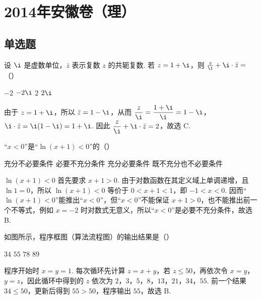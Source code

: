 \chapter{2014年安徽卷（理）}

\section{单选题}

\begin{problem}
设 \(\i\) 是虚数单位，\(\bar z\) 表示复数 \(z\) 的共轭复数. 若 \(z = 1 + \i\)，则 \(\frac{z}{\i} + \i \cdot \bar z = \)（\quad）

\choices
    {\(-2\)}
    {\(-2\i\)}
    {\(2\)}
    {\(2\i\)}

\begin{solution}
由于 \(z=1+\i\)，所以 \(\bar z=1-\i\)，从而 \(\dfrac{z}{\i}=\dfrac{1+\i}{\i}=1-\i\)，\(\i\cdot\bar z=\i(1-\i)=1+\i\). 因此 \(\dfrac{z}{\i}+\i\cdot\bar z=2\)，故选 C.
\end{solution}
\end{problem}

\begin{problem}
“\(x < 0\)”是“\(\ln(x + 1) < 0\)”的（\quad）

\choices
    {充分不必要条件}
    {必要不充分条件}
    {充分必要条件}
    {既不充分也不必要条件}

\begin{solution}
\(\ln(x+1)<0\) 首先要求 \(x+1>0\). 由于对数函数在其定义域上单调递增，且 \(\ln 1=0\)，所以 \(\ln(x+1)<0\) 等价于 \(0<x+1<1\)，即 \(-1<x<0\). 因而“\(\ln(x+1)<0\)”能推出“\(x<0\)”，但“\(x<0\)”不能保证 \(x+1>0\)，也不能推出前一个不等式，例如 \(x=-2\) 时对数式无意义，所以“\(x<0\)”是必要不充分条件，故选 B.
\end{solution}
\end{problem}

\begin{problem}
如图所示，程序框图（算法流程图）的输出结果是（\quad）


\choices
    {\(34\)}
    {\(55\)}
    {\(78\)}
    {\(89\)}

\begin{solution}
程序开始时 \(x=y=1\). 每次循环先计算 \(z=x+y\)，若 \(z\leqslant50\)，再依次令 \(x=y\)，\(y=z\)，因此循环中得到的 \(z\) 依次为 \(2\)，\(3\)，\(5\)，\(8\)，\(13\)，\(21\)，\(34\)，\(55\). 前一个结果 \(34\leqslant50\)，更新后得到 \(55>50\)，程序输出 \(55\)，故选 B.
\end{solution}
\end{problem}

